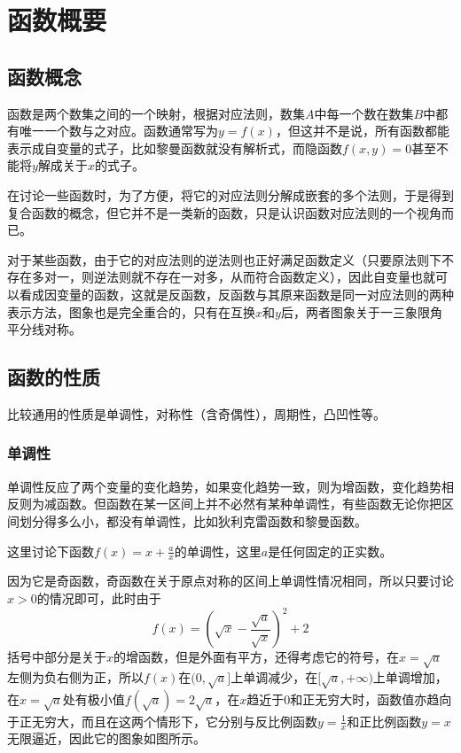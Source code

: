 
\section{函数概要}
\label{sec:function-general}


\subsection{函数概念}
\label{sec:function-concept}

函数是两个数集之间的一个映射，根据对应法则，数集$A$中每一个数在数集$B$中都有唯一一个数与之对应。函数通常写为$y=f(x)$，但这并不是说，所有函数都能表示成自变量的式子，比如黎曼函数就没有解析式，而隐函数$f(x,y)=0$甚至不能将$y$解成关于$x$的式子。

在讨论一些函数时，为了方便，将它的对应法则分解成嵌套的多个法则，于是得到复合函数的概念，但它并不是一类新的函数，只是认识函数对应法则的一个视角而已。

对于某些函数，由于它的对应法则的逆法则也正好满足函数定义（只要原法则下不存在多对一，则逆法则就不存在一对多，从而符合函数定义），因此自变量也就可以看成因变量的函数，这就是反函数，反函数与其原来函数是同一对应法则的两种表示方法，图象也是完全重合的，只有在互换$x$和$y$后，两者图象关于一三象限角平分线对称。

\subsection{函数的性质}
\label{sec:property-of-function}

比较通用的性质是单调性，对称性（含奇偶性），周期性，凸凹性等。

\subsubsection{单调性}
\label{sec:monotonicity-of-function}

单调性反应了两个变量的变化趋势，如果变化趋势一致，则为增函数，变化趋势相反则为减函数。但函数在某一区间上并不必然有某种单调性，有些函数无论你把区间划分得多么小，都没有单调性，比如狄利克雷函数和黎曼函数。

这里讨论下函数$f(x)=x+\frac{a}{x}$的单调性，这里$a$是任何固定的正实数。

因为它是奇函数，奇函数在关于原点对称的区间上单调性情况相同，所以只要讨论$x>0$的情况即可，此时由于
$$
f(x)=\left( \sqrt{x}-\frac{\sqrt{a}}{\sqrt{x}} \right)^2+2
$$
括号中部分是关于$x$的增函数，但是外面有平方，还得考虑它的符号，在$x=\sqrt{a}$左侧为负右侧为正，所以$f(x)$在$(0,\sqrt{a}]$上单调减少，在$[\sqrt{a},+\infty)$上单调增加，在$x=\sqrt{a}$处有极小值$f(\sqrt{a})=2\sqrt{a}$，在$x$趋近于0和正无穷大时，函数值亦趋向于正无穷大，而且在这两个情形下，它分别与反比例函数$y=\frac{1}{x}$和正比例函数$y=x$无限逼近，因此它的图象如图所示。


